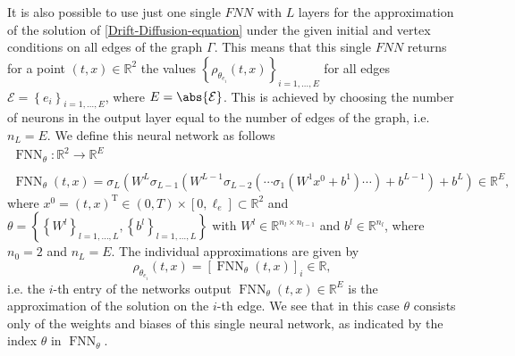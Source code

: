  It is also possible to use just one single $FNN$ with $L$ layers for the approximation of the solution of \cref{Drift-Diffusion-equation} under the given initial and vertex conditions on all edges of the graph $\Gamma$. This means that this single $FNN$ returns for a point $\left(t,x\right) \in \mathbb{R}^2$ the values $\left\{ \rho_{\theta_{e_i}}\left(t, x\right) \right\}_{i = 1, \ldots, E}$ for all edges $\mathcal{E} = \left\{ e_i \right\}_{i = 1, \ldots, E}$, where $E = \abs{\mathcal{E}}$. This is achieved by choosing the number of neurons in the output layer equal to the number of edges of the graph, i.e. $n_L = E$. We define this neural network as follows
\begin{equation} 
    \label{one_for_all}
    \begin{gathered}
        \operatorname{FNN}_{\theta} \colon \mathbb{R}^2 \to \mathbb{R}^E \\
        \\
        \operatorname{FNN}_{\theta}\left(t, x\right) = \sigma_L\left(W^L \sigma_{L-1}\left(W^{L-1}\sigma_{L-2}\left(\cdots \sigma_{1}\left(W^{1}x^0 +b^1\right) \cdots\right) + b^{L-1}\right) + b^{L}\right) \in \mathbb{R}^E, 
    \end{gathered} 
\end{equation} 
where $x^0 = \left(t, x\right)^{\mathrm{T}} \in \left(0, T\right) \times \left[0, \ell_e\right] \subset \mathbb{R}^2$ and $\theta = \left\{ \left\{ W^l \right\}_{l = 1, \ldots, L}, \left\{ b^l \right\}_{l = 1, \ldots, L} \right\}$ with $W^l \in \mathbb{R}^{n_l \times n_{l-1}}$ and $b^l \in \mathbb{R}^{n_l}$, where $n_0 = 2$ and $n_L = E$. The individual approximations are given by 
\begin{equation*}
    \rho_{\theta_{e_i}}\left(t, x\right) = \left[ \operatorname{FNN}_{\theta}\left(t, x\right) \right]_i \in \mathbb{R},
\end{equation*}
i.e. the $i$-th entry of the networks output $\operatorname{FNN}_{\theta}\left(t, x\right) \in \mathbb{R}^E$ is the approximation of the solution on the $i$-th edge. We see that in this case $\theta$ consists only of the weights and biases of this single neural network, as indicated by the index $\theta$ in $\operatorname{FNN}_{\theta}$. \\
